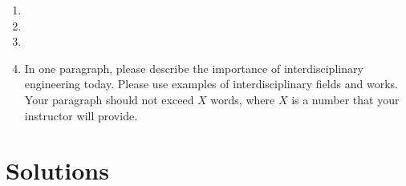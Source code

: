 \documentclass{article}
\begin{document}
\begin{enumerate}
\item %

\item %

\item %

\item In one paragraph, please describe the importance of interdisciplinary engineering today. Please use examples of interdisciplinary fields and works. Your paragraph should not exceed $X$ words, where $X$ is a number that your instructor will provide. 
\end{enumerate} %
\newpage
\section*{Solutions}
\end{document}
